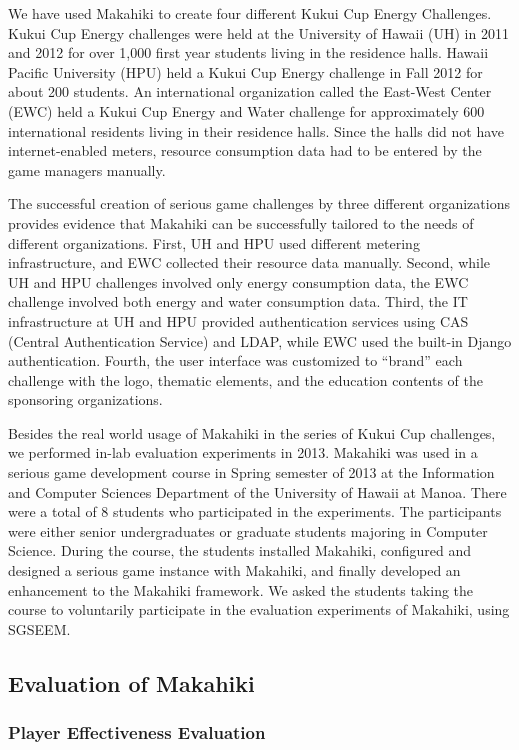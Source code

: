 \documentclass{sigchi}
\begin{document}
We have used Makahiki to create four different Kukui Cup Energy Challenges. Kukui Cup
Energy challenges were held at the University of Hawaii (UH) in 2011 and 2012 for over
1,000 first year students living in the residence halls. Hawaii Pacific University (HPU)
held a Kukui Cup Energy challenge in Fall 2012 for about 200 students. An international
organization called the East-West Center (EWC) held a Kukui Cup Energy and Water challenge
for approximately 600 international residents living in their residence halls. Since the
halls did not have internet-enabled meters, resource consumption data had to be entered by
the game managers manually.

The successful creation of serious game challenges by three different organizations
provides evidence that Makahiki can be successfully tailored
to the needs of different organizations. First, UH and HPU used different metering
infrastructure, and EWC collected their resource data manually.  Second, while UH and HPU
challenges involved only energy consumption data, the EWC challenge involved both energy
and water consumption data. Third, the IT infrastructure at UH and HPU provided
authentication services using CAS (Central Authentication Service) and LDAP, while EWC
used the built-in Django authentication.  Fourth, the user interface was customized to
``brand'' each challenge with the logo, thematic elements, and the education contents of
the sponsoring organizations.

Besides the real world usage of Makahiki in the series of Kukui Cup challenges, we
performed in-lab evaluation experiments in 2013. Makahiki was used in a serious game
development course in Spring semester of 2013 at the Information and Computer Sciences
Department of the University of Hawaii at Manoa. There were a total of 8 students who
participated in the experiments.  The participants were either senior undergraduates or
graduate students majoring in Computer Science. During the course, the students installed
Makahiki, configured and designed a serious game instance with Makahiki, and finally
developed an enhancement to the Makahiki framework. We asked the students taking the
course to voluntarily participate in the evaluation experiments of Makahiki, using SGSEEM.

\subsection{Evaluation of Makahiki}

\subsubsection{Player Effectiveness Evaluation}
\end{document}
